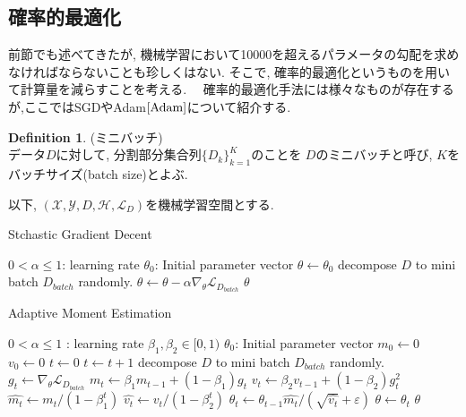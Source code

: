 \documentclass[11pt, a4paper, dvipdfmx]{jsarticle}
\theoremstyle{definition}
\newtheorem{Definition+}[Axiom+]{Definition}
\newcommand{\X}{\mathcal{X}}
\newcommand{\Y}{\mathcal{Y}}
\newcommand{\Hil}{\mathcal{H}}
\newcommand{\Loss}{\mathcal{L}_{D}}
\newcommand{\MLsp}{(\X, \Y, D, \Hil, \Loss)}
\newcommand{\e}{\varepsilon}
\begin{document}
\subsection{確率的最適化}
前節でも述べてきたが, 機械学習において10000を超えるパラメータの勾配を求めなければならないことも珍しくはない.
そこで, 確率的最適化というものを用いて計算量を減らすことを考える.　
確率的最適化手法には様々なものが存在するが,ここではSGDやAdam$\cite{Adam}$について紹介する.
\begin{Definition+}(ミニバッチ)\\
    データ$D$に対して, 分割部分集合列$\{D_{k}\}_{k = 1}^{K}$のことを
    $D$のミニバッチと呼び, $K$をバッチサイズ(batch size)とよぶ. 
\end{Definition+}
以下, $\MLsp$を機械学習空間とする. 
\begin{algorithm}[H]
    \caption{Stchastic Gradient Decent}
    \begin{algorithmic}
        \STATE $0 < \alpha\leq 1$: learning rate
        \REQUIRE $\theta_{0}$: Initial parameter vector
        \STATE $\theta\leftarrow\theta_{0}$
        \STATE decompose $D$ to mini batch $D_{batch}$ randomly.
        \STATE $\theta\leftarrow\theta - \alpha\nabla_{\theta}\mathcal{L}_{D_{batch}}$
        \ENDFOR
        \ENDWHILE
        \RETURN $\theta$
    \end{algorithmic}
\end{algorithm}
\begin{algorithm}[H]
    \caption{Adaptive Moment Estimation}
    \begin{algorithmic}
        \REQUIRE $0<\alpha\leq 1$ : learning rate
        \REQUIRE $\beta_{1}, \beta_{2}\in[0, 1)$
        \REQUIRE $\theta_{0}$: Initial parameter vector
        \STATE $m_{0}\leftarrow 0$
        \STATE $v_{0}\leftarrow 0$
        \STATE $t\leftarrow 0$
        \STATE $t\leftarrow t + 1$
        \STATE decompose $D$ to mini batch $D_{batch}$ randomly.
        \STATE $g_{t}\leftarrow \nabla_{\theta}\mathcal{L}_{D_{batch}}$
        \STATE $m_{t}\leftarrow\beta_{1} m_{t - 1} + (1 - \beta_{1})g_{t}$
        \STATE $v_{t}\leftarrow\beta_{2} v_{t - 1} + (1 - \beta_{2})g_{t}^{2}$
        \STATE $\hat{m_{t}}\leftarrow m_{t}/(1 - \beta_{1}^{t})$
        \STATE $\hat{v_{t}}\leftarrow v_{t}/(1 - \beta_{2}^{t})$
        \STATE $\theta_{t}\leftarrow\theta_{t - 1}\hat{m_{t}}/(\sqrt{\hat{v_{t}}} + \e)$
        \ENDFOR
        \STATE $\theta\leftarrow\theta_{t}$
        \ENDWHILE
        \RETURN $\theta$
    \end{algorithmic}
\end{algorithm}
\end{document}
